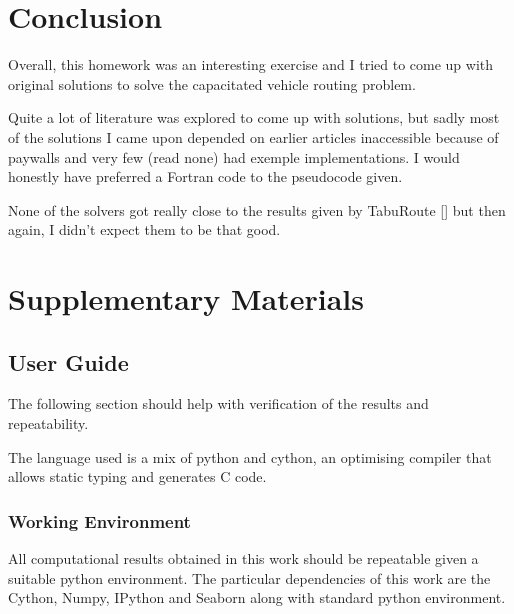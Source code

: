 \documentclass{article} %
\begin{document}
\section{Conclusion}

Overall, this homework was an interesting exercise and I tried to come up with original solutions to solve the capacitated vehicle routing problem.\newline

Quite a lot of literature was explored to come up with solutions, but sadly most of the solutions I came upon depended on earlier articles inaccessible because of paywalls and very few (read none) had exemple implementations. I would honestly have preferred a Fortran code to the pseudocode given.\newline

None of the solvers got really close to the results given by TabuRoute [\citep{taburoute}] but then again, I didn't expect them to be that good.\newline









\newpage
\section{Supplementary Materials}

\subsection{User Guide}
\label{user_guide}

The following section should help with verification of the results and repeatability.\newline

The language used is a mix of python and cython, an optimising compiler that allows static typing and generates C code.


\subsubsection{Working Environment}
All computational results obtained in this work should be repeatable given a suitable python environment. The particular dependencies of this work are the Cython, Numpy, IPython and Seaborn along with standard python environment.\newline
\end{document}
